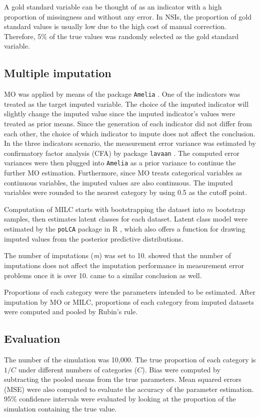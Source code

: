 \documentclass[oneside,a4paper]{article}
\begin{document}
A gold standard variable can be thought of as an indicator with a high proportion of missingness and without any error. In NSIs, the proportion of gold standard values is usually low due to the high cost of manual correction. Therefore, 5\% of the true values was randomly selected as the gold standard variable. 

\subsection{Multiple imputation}
MO was applied by means of the package \texttt{Amelia} \cite{Amelia}. One of the indicators was treated as the target imputed variable. The choice of the imputed indicator will slightly change the imputed value since the imputed indicator’s values were treated as prior means. Since the generation of each indicator did not differ from each other, the choice of which indicator to impute does not affect the conclusion. In the three indicators scenario, the measurement error variance was estimated by confirmatory factor analysis (CFA) by package \texttt{lavaan} \cite{lavaan}. The computed error variances were then plugged into \texttt{Amelia} as a prior variance to continue the further MO estimation. Furthermore, since MO treats categorical variables as continuous variables, the imputed values are also continuous. The imputed variables were rounded to the nearest category by using 0.5 as the cutoff point. 

Computation of MILC starts with bootstrapping the dataset into $m$ bootstrap samples, then estimates latent classes for each dataset. Latent class model were estimated by the \texttt{poLCA} package in R \cite{polca}, which also offers a function for drawing imputed values from the posterior predictive distributions.

The number of imputations (\textit{m}) was set to 10.  showed that the number of imputations does not affect the imputation performance in measurement error problems once it is over 10.  came to a similar conclusion as well.  

Proportions of each category were the parameters intended to be estimated. After imputation by MO or MILC, proportions of each category from imputed datasets were computed and pooled by Rubin’s rule. 

\subsection{Evaluation}
The number of the simulation was 10,000. The true proportion of each category is $1/C$ under different numbers of categories ($C$). Bias were computed by subtracting the pooled means from the true parameters. Mean squared errors (MSE) were also computed to evaluate the accuracy of the parameter estimation. 95\% confidence intervals were evaluated by looking at the proportion of the simulation containing the true value.
\end{document}
